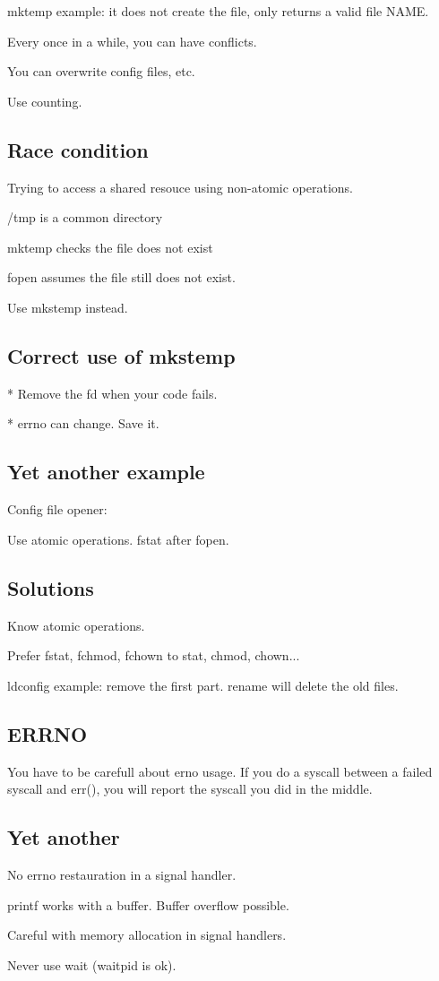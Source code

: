 \documentclass[a4paper,11pt]{article}
\begin{document}
mktemp example: it does not create the file, only returns a valid file NAME.

Every once in a while, you can have conflicts.

You can overwrite config files, etc.

Use counting.

\subsection{Race condition}

Trying to access a shared resouce using non-atomic operations.

/tmp is a common directory

mktemp checks the file does not exist

fopen assumes the file still does not exist.

Use mkstemp instead.

\subsection{Correct use of mkstemp}

* Remove the fd when your code fails.

* errno can change. Save it.

\subsection{Yet another example}

Config file opener:

Use atomic operations. fstat after fopen.

\subsection{Solutions}

Know atomic operations.

Prefer fstat, fchmod, fchown to stat, chmod, chown...

ldconfig example: remove the first part. rename will delete the old files.

\subsection{ERRNO}

You have to be carefull about erno usage. If you do a syscall between a failed
syscall and err(), you will report the syscall you did in the middle.

\subsection{Yet another}

No errno restauration in a signal handler.

printf works with a buffer. Buffer overflow possible.

Careful with memory allocation in signal handlers.

Never use wait (waitpid is ok).
\end{document}
